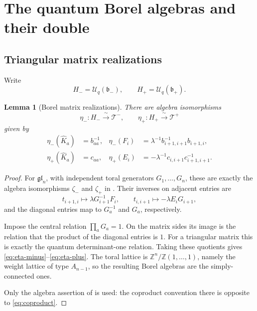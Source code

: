\documentclass[11pt]{amsart}
\newtheorem{lemma}[theorem]{Lemma}
\theoremstyle{remark}
\newcommand{\UU}{\mathcal U_q}
\newcommand{\bplus}{\mathfrak b_+}
\newcommand{\bminus}{\mathfrak b_-}
\begin{document}
\section{The quantum Borel algebras and their double}

\subsection{Triangular matrix realizations}

Write
\[
 H_-=\UU(\bminus),\qquad H_+=\UU(\bplus).
\]

\begin{lemma}[Borel matrix realizations]\label{lem:borel}
There are algebra isomorphisms
\[
 \eta_-:H_-\xrightarrow{\ \sim\ }\mathcal T^-,
 \qquad
 \eta_+:H_+\xrightarrow{\ \sim\ }\mathcal T^+
\]
given by
\begin{align}
 \eta_-(\widehat K_a)&=b_{aa}^{-1},
 &
 \eta_-(F_i)&=\lambda^{-1}b_{i+1,i+1}^{-1}b_{i+1,i},
 \label{eq:eta-minus}\\
 \eta_+(\widehat K_a)&=c_{aa},
 &
 \eta_+(E_i)&=-\lambda^{-1}c_{i,i+1}c_{i+1,i+1}^{-1}.
 \label{eq:eta-plus}
\end{align}
\end{lemma}

\begin{proof}
For $\mathfrak{gl}_n$, with independent toral generators
$G_1,\ldots,G_n$, these are exactly the algebra isomorphisms
$\zeta_-$ and $\zeta_+$ in \cite[Section~2.4]{Gav}.
Their inverses on adjacent entries are
\[
 t_{i+1,i}\longmapsto\lambda G_{i+1}^{-1}F_i,
 \qquad
 t_{i,i+1}\longmapsto-\lambda E_iG_{i+1},
\]
and the diagonal entries map to $G_a^{-1}$ and $G_a$,
respectively.

Impose the central relation $\prod_aG_a=1$.
On the matrix sides its image is the relation that the product
of the diagonal entries is $1$.  For a triangular matrix this is
exactly the quantum determinant-one relation.  Taking these
quotients gives \eqref{eq:eta-minus}--\eqref{eq:eta-plus}.
The toral lattice is
$\mathbb Z^n/\mathbb Z(1,\ldots,1)$, namely the weight lattice of
type $A_{n-1}$, so the resulting Borel algebras are the
simply-connected ones.

Only the algebra assertion of \cite[Section~2.4]{Gav} is used:
the coproduct convention there is opposite to
\eqref{eq:coproduct}.
\end{proof}

\end{document}
